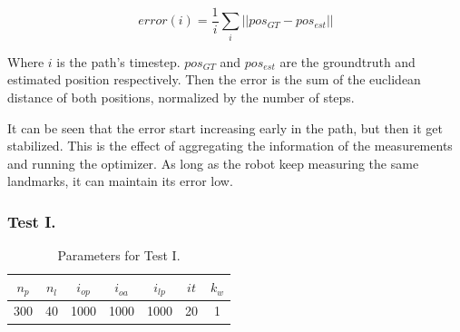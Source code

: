 \begin{equation}
error (i) = \frac{1}{i} \sum_{i} ||pos_{GT}-pos_{est}||
\end{equation} 

Where $i$ is the path's timestep. $pos_{GT}$ and $pos_{est}$ are the groundtruth and estimated position respectively. Then the error is the sum of the euclidean distance of both positions, normalized by the number of steps. 

It can be seen that the error start increasing early in the path, but then it get stabilized. This is the effect of aggregating the information of the measurements and running the optimizer. As long as the robot keep measuring the same landmarks, it can maintain its error low. 


\subsubsection{Test I.}
\label{sec:test-i}

\begin{table}[htbp!]
\centering
\begin{tabular}{|c|c|c|c|c|c|c|}
\hline
$n_p$ & $n_l$ & $i_{op}$ & $i_{oa}$ & $i_{lp}$ & $it$ & $k_w$\\
\hline \hline
300 & 40 & 1000 & 1000 & 1000 & 20 & 1\\
\hline 
\end{tabular}
\caption{Parameters for Test I.}
\label{tab:test-i}
\end{table}

